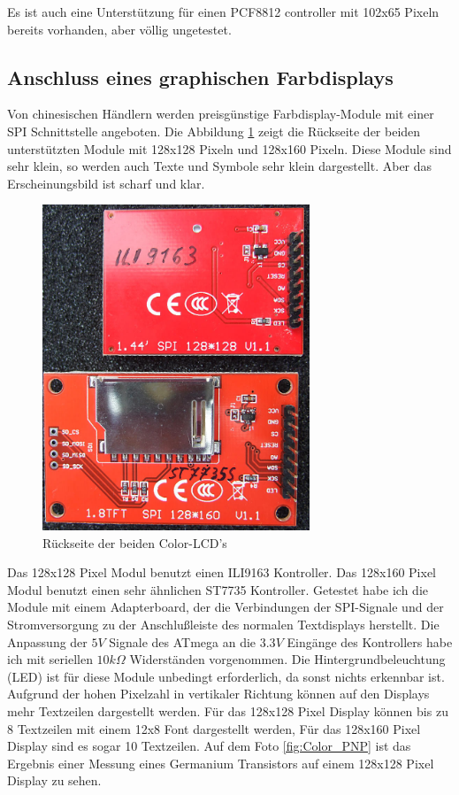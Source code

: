 Es ist auch eine Unterstützung für einen PCF8812 controller mit 102x65 Pixeln bereits vorhanden,
aber völlig ungetestet.

\subsection{Anschluss eines graphischen Farbdisplays}

Von chinesischen Händlern werden preisgünstige Farbdisplay-Module mit einer SPI Schnittstelle angeboten.
Die Abbildung \ref{fig:Color_both} zeigt die Rückseite der beiden unterstützten Module mit 128x128 Pixeln
und 128x160 Pixeln.
Diese Module sind sehr klein, so werden auch Texte und Symbole sehr klein dargestellt.
Aber das Erscheinungsbild ist scharf und klar.

\begin{figure}[H]
\centering
\includegraphics[width=8cm]{../PNG/Color_ILI9163_ST7735.jpg}
\caption{Rückseite der beiden Color-LCD's}
\label{fig:Color_both}
\end{figure}

Das 128x128 Pixel Modul benutzt einen ILI9163 Kontroller.
Das 128x160 Pixel Modul benutzt einen sehr ähnlichen ST7735 Kontroller.
Getestet habe ich die Module mit einem Adapterboard, der die Verbindungen
der SPI-Signale und der Stromversorgung zu der Anschlußleiste des normalen Textdisplays
herstellt. Die Anpassung der \(5V\) Signale des ATmega an die \(3.3V\) Eingänge des Kontrollers
habe ich mit seriellen \(10k\Omega\) Widerständen vorgenommen.
Die Hintergrundbeleuchtung (LED) ist für diese Module unbedingt erforderlich, da sonst
nichts erkennbar ist.
Aufgrund der hohen Pixelzahl in vertikaler Richtung können auf den Displays mehr Textzeilen dargestellt
werden. Für das 128x128 Pixel Display können bis zu 8 Textzeilen mit einem 12x8 Font dargestellt werden,
Für das 128x160 Pixel Display sind es sogar 10 Textzeilen.
Auf dem Foto \ref{fig:Color_PNP} ist das Ergebnis einer Messung eines Germanium Transistors auf einem
128x128 Pixel Display zu sehen.


